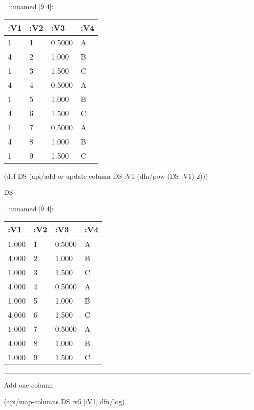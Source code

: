 \documentclass[]{article}
\newenvironment{Shaded}{\begin{snugshade}}{\end{snugshade}}
\newcommand{\DecValTok}[1]{\textcolor[rgb]{0.00,0.00,0.81}{#1}}
\newcommand{\FunctionTok}[1]{\textcolor[rgb]{0.00,0.00,0.00}{#1}}
\newcommand{\BuiltInTok}[1]{#1}
\newcommand{\AttributeTok}[1]{\textcolor[rgb]{0.77,0.63,0.00}{#1}}
\newcommand{\NormalTok}[1]{#1}
\begin{document}
\_unnamed {[}9 4{]}:

\begin{longtable}[]{@{}llll@{}}
\toprule
:V1 & :V2 & :V3 & :V4\tabularnewline
\midrule
\endhead
1 & 1 & 0.5000 & A\tabularnewline
4 & 2 & 1.000 & B\tabularnewline
1 & 3 & 1.500 & C\tabularnewline
4 & 4 & 0.5000 & A\tabularnewline
1 & 5 & 1.000 & B\tabularnewline
4 & 6 & 1.500 & C\tabularnewline
1 & 7 & 0.5000 & A\tabularnewline
4 & 8 & 1.000 & B\tabularnewline
1 & 9 & 1.500 & C\tabularnewline
\bottomrule
\end{longtable}

\begin{Shaded}
\begin{Highlighting}[]
\NormalTok{(}\BuiltInTok{def}\FunctionTok{ DS }\NormalTok{(api/add-or-update-column DS }\AttributeTok{:V1}\NormalTok{ (dfn/pow (DS }\AttributeTok{:V1}\NormalTok{) }\DecValTok{2}\NormalTok{)))}
\end{Highlighting}
\end{Shaded}

\begin{Shaded}
\begin{Highlighting}[]
\NormalTok{DS}
\end{Highlighting}
\end{Shaded}

\_unnamed {[}9 4{]}:

\begin{longtable}[]{@{}llll@{}}
\toprule
:V1 & :V2 & :V3 & :V4\tabularnewline
\midrule
\endhead
1.000 & 1 & 0.5000 & A\tabularnewline
4.000 & 2 & 1.000 & B\tabularnewline
1.000 & 3 & 1.500 & C\tabularnewline
4.000 & 4 & 0.5000 & A\tabularnewline
1.000 & 5 & 1.000 & B\tabularnewline
4.000 & 6 & 1.500 & C\tabularnewline
1.000 & 7 & 0.5000 & A\tabularnewline
4.000 & 8 & 1.000 & B\tabularnewline
1.000 & 9 & 1.500 & C\tabularnewline
\bottomrule
\end{longtable}

\begin{center}\rule{0.5\linewidth}{0.5pt}\end{center}

Add one column

\begin{Shaded}
\begin{Highlighting}[]
\NormalTok{(api/map-columns DS }\AttributeTok{:v5}\NormalTok{ [}\AttributeTok{:V1}\NormalTok{] dfn/log)}
\end{Highlighting}
\end{Shaded}
\end{document}
